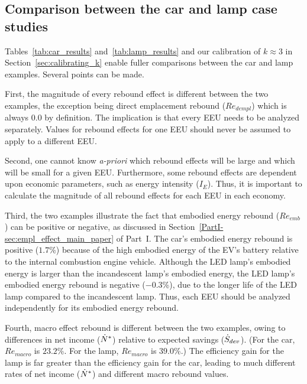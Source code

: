 \documentclass[12pt]{article}\usepackage[]{graphicx}\usepackage[]{xcolor}
\begin{document}
\subsection{Comparison between the car and lamp case studies}
\label{sec:case_study_comparison}



Tables~\ref{tab:car_results} and~\ref{tab:lamp_results}
and our calibration of $k \approx 3$ in Section~\ref{sec:calibrating_k} 
enable fuller comparisons between the car and lamp examples. 
Several points can be made.

First, 
the magnitude of every rebound effect is different between the two examples, 
the exception being direct emplacement rebound ($Re_{dempl}$)
which is always 0.0 by definition.
The implication is that every EEU needs to be analyzed separately. 
Values for rebound effects  
for one EEU should never be assumed to apply to a different EEU.

Second, 
one cannot know \emph{a-priori} which rebound effects
will be large and which will be small
for a given EEU.
Furthermore, some rebound effects are dependent upon economic parameters,
such as energy intensity ($I_E$).
Thus, it is important to calculate the magnitude of all rebound effects 
for each EEU in each economy.

Third,
the two examples illustrate the fact that 
embodied energy rebound ($Re_{emb}$) can be positive or negative,
as discussed in Section~\ref{PartI-sec:empl_effect_main_paper} of Part~I.
The car's embodied energy rebound is positive ($1.7$\%) 
because of the high embodied energy of the EV's battery
relative to the internal combustion engine vehicle. 
Although the LED lamp's embodied energy is larger than the 
incandescent lamp's embodied energy, 
the LED lamp's embodied energy rebound is negative ($-0.3$\%),
due to the longer life of the LED lamp compared to the incandescent lamp.
Thus, each EEU should be analyzed independently for its embodied energy rebound.

Fourth,
macro effect rebound is different between the two examples, 
owing to differences in net income (${\dot{N}}^*$) relative to expected savings ($\dot{S}_{dev}$).
(For the car, $Re_{macro}$ is $23.2$\%.
For the lamp, $Re_{macro}$ is $39.0$\%.)
The efficiency gain for the lamp is far greater than the efficiency gain for the car,
leading to much different rates of net income (${\dot{N}}^*$) and
different macro rebound values.

\end{document}
